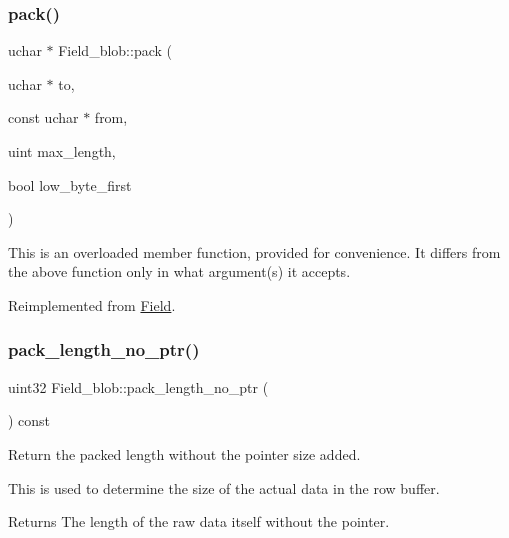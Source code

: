 \subsubsection{\texorpdfstring{pack()}{pack()}}
{\footnotesize\ttfamily uchar $\ast$ Field\+\_\+blob\+::pack (\begin{DoxyParamCaption}\item[{uchar $\ast$}]{to,  }\item[{const uchar $\ast$}]{from,  }\item[{uint}]{max\+\_\+length,  }\item[{bool}]{low\+\_\+byte\+\_\+first }\end{DoxyParamCaption})\hspace{0.3cm}{\ttfamily [virtual]}}

This is an overloaded member function, provided for convenience. It differs from the above function only in what argument(s) it accepts.

Reimplemented from \mbox{\hyperlink{classField_a9eaff8d3425ef0e1da69b32cbd8f2879}{Field}}.

\mbox{\label{classField__blob_a3d5a1318dd303daf7a7f7d2e1f6edf84}} 
\subsubsection{\texorpdfstring{pack\+\_\+length\+\_\+no\+\_\+ptr()}{pack\_length\_no\_ptr()}}
{\footnotesize\ttfamily uint32 Field\+\_\+blob\+::pack\+\_\+length\+\_\+no\+\_\+ptr (\begin{DoxyParamCaption}{ }\end{DoxyParamCaption}) const\hspace{0.3cm}{\ttfamily [inline]}}

Return the packed length without the pointer size added.

This is used to determine the size of the actual data in the row buffer.

\begin{DoxyReturn}{Returns}
The length of the raw data itself without the pointer. 
\end{DoxyReturn}
\mbox{\label{classField__blob_aa05f64033ecd31f3392d1a7f7cd1c17a}} 
